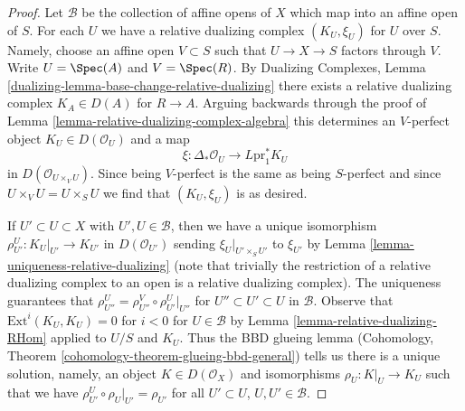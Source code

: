 \begin{proof}
Let $\mathcal{B}$ be the collection of affine opens of
$X$ which map into an affine open of $S$. For each $U$
we have a relative dualizing complex $(K_U, \xi_U)$ for
$U$ over $S$. Namely, choose an affine open
$V \subset S$ such that $U \to X \to S$ factors through $V$.
Write $U = \Spec(A)$ and $V = \Spec(R)$. By
Dualizing Complexes, Lemma \ref{dualizing-lemma-base-change-relative-dualizing}
there exists a relative dualizing complex $K_A \in D(A)$
for $R \to A$. Arguing backwards through the proof of
Lemma \ref{lemma-relative-dualizing-complex-algebra}
this determines an $V$-perfect object $K_U \in D(\mathcal{O}_U)$
and a map
$$
\xi : \Delta_*\mathcal{O}_U \to L\text{pr}_1^*K_U
$$
in $D(\mathcal{O}_{U \times_V U})$. Since being $V$-perfect is the
same as being $S$-perfect and since $U \times_V U = U \times_S U$
we find that $(K_U, \xi_U)$ is as desired.

\medskip\noindent
If $U' \subset U \subset X$ with $U', U \in \mathcal{B}$, then
we have a unique isomorphism $\rho_{U'}^U : K_U|_{U'} \to K_{U'}$
in $D(\mathcal{O}_{U'})$ sending $\xi_U|_{U' \times_S U'}$
to $\xi_{U'}$ by Lemma \ref{lemma-uniqueness-relative-dualizing}
(note that trivially the restriction of a relative dualizing
complex to an open is a relative dualizing complex).
The uniqueness guarantees that
$\rho^U_{U''} = \rho^V_{U''} \circ \rho ^U_{U'}|_{U''}$
for $U'' \subset U' \subset U$ in $\mathcal{B}$.
Observe that $\text{Ext}^i(K_U, K_U) = 0$ for $i < 0$
for $U \in \mathcal{B}$ by Lemma \ref{lemma-relative-dualizing-RHom}
applied to $U/S$ and $K_U$.
Thus the BBD glueing lemma
(Cohomology, Theorem \ref{cohomology-theorem-glueing-bbd-general})
tells us there is a unique solution, namely, an object
$K \in D(\mathcal{O}_X)$ and isomorphisms $\rho_U : K|_U \to K_U$
such that we have
$\rho^U_{U'} \circ \rho_U|_{U'} = \rho_{U'}$ for all $U' \subset U$,
$U, U' \in \mathcal{B}$.


\end{proof}
